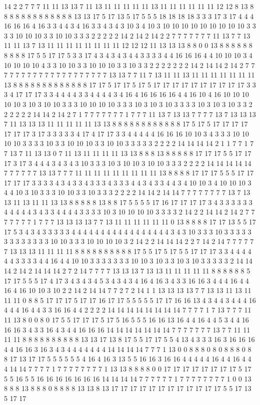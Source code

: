 14 2 2 7 7 7 11 11 13 13 7 11 13 11 11 11 11 11 13 11 11 11 11 11 11 12 12 8 13 8 8 8 8 8 8 8 8 8 8 8 8 8 13 13 17 5 17 13 5 17 5 5 5 18 18 18 18 3 3 3 17 3 17 4 4 4 16 16 16 4 16 3 3 4 4 3 4 16 3 3 4 3 4 3 10 3 4 10 3 10 10 10 10 10 10 10 10 10 3 3 3 3 10 10 10 3 3 10 10 3 3 3 2 2 2 2 2 14 2 14 2 14 2 2 7 7 7 7 7 7 7 11 13 7 7 13 11 11 13 7 13 11 11 11 11 11 11 11 11 12 12 12 11 13 13 13 8 8 0 0 13 8 8 8 8 8 8 8 8 8 8 17 5 5 17 17 5 3 3 17 4 3 4 3 4 3 4 4 3 3 3 3 4 4 16 16 16 4 4 10 10 10 3 4 10 10 10 10 4 3 3 10 10 3 3 10 10 10 3 3 10 3 3 2 2 2 2 2 2 2 14 2 14 14 2 14 2 7 7 7 7 7 7 7 7 7 7 7 7 7 7 7 7 7 7 7 7 13 13 7 7 11 7 13 11 11 13 11 11 11 11 11 11 11 13 8 8 8 8 8 8 8 8 8 8 8 8 8 17 17 5 17 17 5 17 5 17 17 17 17 17 17 17 17 17 17 3 3 3 4 17 17 17 3 3 4 4 4 4 3 3 4 4 4 4 3 4 16 4 16 16 16 16 4 4 16 10 4 16 10 10 10 10 10 3 10 3 10 10 3 3 3 10 10 10 10 3 3 3 10 3 10 3 10 3 3 3 3 10 3 10 3 10 3 3 2 2 2 2 2 2 14 14 2 14 2 7 1 7 7 7 7 7 7 7 1 7 7 7 11 13 7 13 13 7 7 7 7 13 7 13 13 13 7 11 13 13 13 11 11 11 11 11 13 13 8 8 8 8 8 8 8 8 8 8 8 8 17 5 17 5 17 17 17 17 17 17 17 3 17 3 3 3 3 3 4 17 4 17 17 3 3 4 4 4 4 4 16 16 16 10 10 3 4 3 3 3 10 10 10 10 3 3 3 3 10 3 3 10 10 10 3 3 10 10 3 3 3 3 3 2 2 2 2 14 14 14 14 2 1 1 7 7 1 7 7 13 7 11 13 13 0 7 11 13 11 11 11 11 13 13 8 8 8 13 8 8 8 8 8 17 17 17 5 5 17 17 17 3 17 3 4 4 4 3 4 3 4 3 10 3 3 3 10 3 10 10 3 10 10 3 3 3 2 2 2 2 14 14 14 14 14 7 7 7 7 7 7 13 13 7 7 7 11 11 11 11 11 11 11 11 11 13 8 8 8 8 17 17 17 5 5 5 17 17 17 17 17 3 3 3 3 4 3 4 3 3 4 3 3 3 4 3 3 3 4 4 3 4 3 3 4 4 3 4 10 10 3 4 10 10 10 3 4 4 10 3 10 3 3 3 10 10 3 3 10 3 3 3 2 2 2 2 14 14 2 14 14 7 7 7 7 7 7 7 7 13 7 13 13 11 13 11 11 13 13 8 8 8 8 8 13 8 8 17 5 5 5 5 17 16 17 17 17 17 3 4 3 3 3 3 3 3 4 4 4 4 4 3 4 3 3 4 4 4 4 3 3 3 3 10 3 10 10 10 10 3 3 3 3 2 14 2 2 14 14 2 14 2 7 7 7 7 7 7 7 1 7 7 7 13 13 13 13 7 7 13 11 11 11 11 11 11 0 13 8 8 8 8 17 17 13 5 5 17 17 5 3 4 3 4 3 3 3 3 3 4 4 4 4 4 4 4 4 4 4 4 4 4 4 4 4 4 3 4 3 10 3 3 3 10 3 3 3 3 3 3 3 3 3 3 3 3 3 10 10 3 3 3 10 10 10 10 3 2 14 2 2 14 14 14 2 2 7 14 2 14 7 7 7 7 7 7 13 13 13 11 11 11 11 8 8 8 8 8 8 8 8 8 8 17 5 5 17 5 17 5 5 17 17 17 3 3 4 4 4 4 4 4 3 3 3 3 4 4 16 4 4 10 10 3 3 3 3 3 3 3 10 10 3 10 3 3 10 3 10 3 3 3 3 3 2 14 14 14 2 14 2 14 14 14 2 7 2 14 7 7 7 7 13 13 13 7 13 13 11 11 11 11 11 8 8 8 8 8 8 5 17 17 5 5 5 17 4 17 3 4 3 4 3 4 5 3 4 3 4 3 4 16 4 16 3 4 3 3 16 16 3 4 4 4 16 4 4 16 4 16 10 10 3 10 2 2 14 2 14 14 7 7 2 7 2 14 1 1 13 13 13 13 7 7 13 13 11 13 11 11 11 0 8 8 5 17 17 17 5 17 17 16 17 17 5 5 5 5 5 17 17 16 16 13 4 3 4 4 3 4 4 4 16 4 4 4 16 4 4 3 3 16 16 4 4 2 2 2 2 14 14 14 14 14 14 14 14 7 7 7 7 1 7 13 7 7 7 11 11 13 8 0 0 8 0 17 5 5 17 17 17 5 17 5 16 5 5 5 16 16 13 16 4 4 16 4 4 5 3 4 4 16 16 16 3 4 3 3 16 4 3 4 4 16 16 16 14 14 14 14 14 14 14 7 7 7 7 7 7 7 13 7 7 11 11 11 11 8 8 8 8 8 8 8 8 8 8 13 13 17 13 8 17 5 5 17 17 5 5 4 13 4 3 3 3 16 3 16 16 16 4 4 16 16 3 16 3 4 3 4 4 4 4 4 4 4 14 14 14 14 7 7 7 1 13 0 0 8 8 8 0 8 0 8 8 8 0 8 8 17 13 17 17 5 5 5 5 5 5 4 16 4 16 3 13 5 5 16 16 3 16 16 4 4 4 4 4 16 4 4 16 4 4 4 14 14 7 7 7 7 1 7 7 7 7 7 7 7 7 1 13 13 8 8 8 8 0 0 17 17 17 17 17 17 17 17 5 17 5 5 16 5 5 16 16 16 16 16 16 16 14 14 14 14 7 7 7 7 7 7 1 7 7 7 7 7 7 7 7 1 0 0 13 8 8 8 13 8 8 8 0 8 8 8 8 13 13 8 13 17 17 17 17 17 17 17 17 17 17 17 17 5 5 17 13 5 17 17 